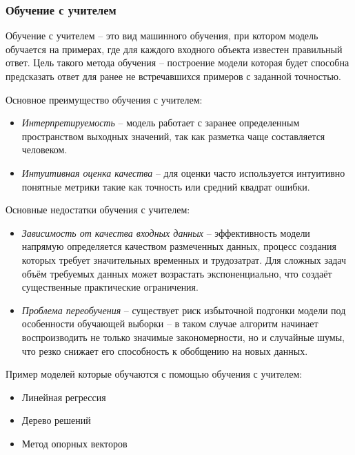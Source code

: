 \documentclass[../part_1.tex]{subfiles}
\begin{document}
\subsubsection{Обучение с учителем} %
    \label{sec:with_teacher}
    \par Обучение с учителем -- это вид машинного обучения, при котором модель обучается на примерах, где для каждого входного объекта известен правильный ответ. Цель такого метода обучения -- построение модели которая будет способна предсказать ответ для ранее не встречавшихся примеров с заданной точностью.
    \par Основное преимущество обучения с учителем:
    \begin{itemize}
        \item \textit{Интерпретируемость} -- модель работает с заранее определенным пространством выходных значений, так как разметка чаще составляется человеком.
        \item \textit{Интуитивная оценка качества} -- для оценки часто используется интуитивно понятные метрики такие как точность или средний квадрат ошибки. 
    \end{itemize}
    \par Основные недостатки обучения с учителем:
    \begin{itemize}
        \item \textit{Зависимость от качества входных данных} -- эффективность модели напрямую определяется качеством размеченных данных, процесс создания которых требует значительных временных и трудозатрат. Для сложных задач объём требуемых данных может возрастать экспоненциально, что создаёт существенные практические ограничения.
        \item \textit{Проблема переобучения} -- существует риск избыточной подгонки модели под особенности обучающей выборки -- в таком случае алгоритм начинает воспроизводить не только значимые закономерности, но и случайные шумы, что резко снижает его способность к обобщению на новых данных.
    \end{itemize}
    \par Пример моделей которые обучаются с помощью обучения с учителем:
    \begin{itemize}
        \item Линейная регрессия
        \item Дерево решений
        \item Метод опорных векторов
    \end{itemize}
    
\end{document}

